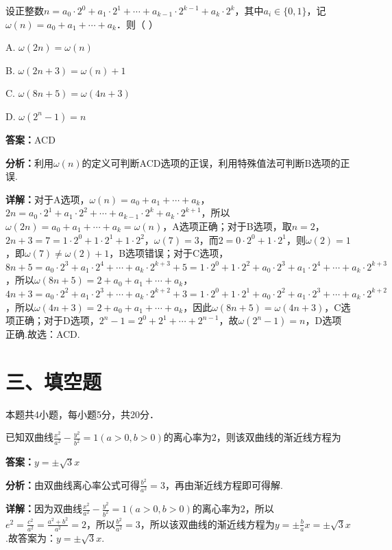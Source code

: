 \begin{question}[points=5]
设正整数$n=a_0\cdot2^0+a_1\cdot2^1+\cdots+a_{k-1}\cdot2^{k-1}+a_k\cdot2^k$，其中$a_i\in\{0,1\}$，记$\omega(n)=a_0+a_1+\cdots+a_k$．则（ ）
\begin{choices}
  \item A. $\omega(2n)=\omega(n)$
  \item B. $\omega(2n+3)=\omega(n)+1$
  \item C. $\omega(8n+5)=\omega(4n+3)$
  \item D. $\omega(2^n-1)=n$
\end{choices}
\begin{solution}
\textbf{答案：}ACD

\textbf{分析：}利用$\omega(n)$的定义可判断ACD选项的正误，利用特殊值法可判断B选项的正误.

\textbf{详解：}对于A选项，$\omega(n)=a_0+a_1+\cdots+a_k$，$2n=a_0\cdot2^1+a_1\cdot2^2+\cdots+a_{k-1}\cdot2^k+a_k\cdot2^{k+1}$，所以$\omega(2n)=a_0+a_1+\cdots+a_k=\omega(n)$，A选项正确；对于B选项，取$n=2$，$2n+3=7=1\cdot2^0+1\cdot2^1+1\cdot2^2$，$\omega(7)=3$，而$2=0\cdot2^0+1\cdot2^1$，则$\omega(2)=1$，即$\omega(7)\neq\omega(2)+1$，B选项错误；对于C选项，$8n+5=a_0\cdot2^3+a_1\cdot2^4+\cdots+a_k\cdot2^{k+3}+5=1\cdot2^0+1\cdot2^2+a_0\cdot2^3+a_1\cdot2^4+\cdots+a_k\cdot2^{k+3}$，所以$\omega(8n+5)=2+a_0+a_1+\cdots+a_k$，$4n+3=a_0\cdot2^2+a_1\cdot2^3+\cdots+a_k\cdot2^{k+2}+3=1\cdot2^0+1\cdot2^1+a_0\cdot2^2+a_1\cdot2^3+\cdots+a_k\cdot2^{k+2}$，所以$\omega(4n+3)=2+a_0+a_1+\cdots+a_k$，因此$\omega(8n+5)=\omega(4n+3)$，C选项正确；对于D选项，$2^n-1=2^0+2^1+\cdots+2^{n-1}$，故$\omega(2^n-1)=n$，D选项正确.故选：ACD.
\end{solution}
\end{question}

\section*{三、填空题}
本题共4小题，每小题5分，共20分．

\begin{question}[points=5]
已知双曲线$\frac{x^2}{a^2}-\frac{y^2}{b^2}=1(a>0,b>0)$的离心率为$2$，则该双曲线的渐近线方程为
\fillin[{$y=\pm\sqrt{3}x$}]
\begin{solution}
\textbf{答案：}$y=\pm\sqrt{3}x$

\textbf{分析：}由双曲线离心率公式可得$\frac{b^2}{a^2}=3$，再由渐近线方程即可得解.

\textbf{详解：}因为双曲线$\frac{x^2}{a^2}-\frac{y^2}{b^2}=1(a>0,b>0)$的离心率为$2$，所以$e^2=\frac{c^2}{a^2}=\frac{a^2+b^2}{a^2}=2$，所以$\frac{b^2}{a^2}=3$，所以该双曲线的渐近线方程为$y=\pm\frac{b}{a}x=\pm\sqrt{3}x$.故答案为：$y=\pm\sqrt{3}x$.
\end{solution}
\end{question}

